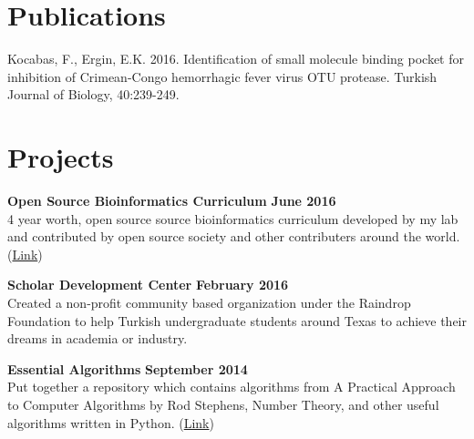 \documentclass[margin,line]{res}
\begin{document}
\begin{resume}
\section{\sc Publications}
Kocabas, F., Ergin, E.K. 2016. Identification of small molecule binding pocket for inhibition of Crimean-Congo hemorrhagic fever virus OTU protease. Turkish Journal of Biology, 40:239-249.



%

%



\section{\sc Projects}
{\bf Open Source Bioinformatics Curriculum} \hfill {\bf June  2016}\\
4 year worth, open source source bioinformatics curriculum developed by my lab and contributed by open source society and other contributers around the world. (\href{https://github.com/open-source-society/bioinformatics}{Link})

{\bf Scholar Development Center} \hfill {\bf February  2016}\\
Created a non-profit community based organization under the Raindrop Foundation to help Turkish undergraduate students around Texas to achieve their dreams in academia or industry. 

{\bf Essential Algorithms} \hfill {\bf September 2014}\\
Put together a repository which contains algorithms from A Practical Approach to Computer Algorithms by Rod Stephens, Number Theory, and other useful algorithms written in Python. (\href{https://github.com/eneskemalergin/Essential_Algorithms}{Link})


\end{resume}
\end{document}
